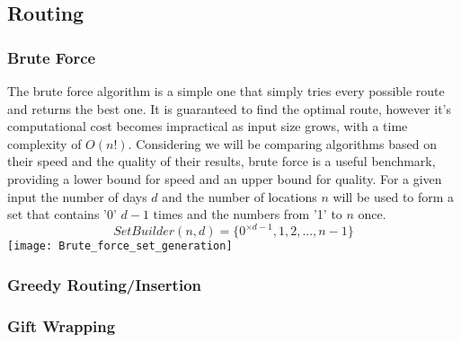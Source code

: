 
\subsection{Routing}\label{subsec:routing}
\subsubsection{Brute Force}\label{subsubsec:brute-force-routing}
The brute force algorithm is a simple one that simply tries every possible route and returns the best one.
It is guaranteed to find the optimal route, however it's computational cost becomes impractical as input size grows,
with a time complexity of $O(n!)$.
Considering we will be comparing algorithms based on their speed and the quality of their results, brute force is a
useful benchmark, providing a lower bound for speed and an upper bound for quality.
\pagebreak
For a given input the number of days $d$ and the number of locations $n$ will be used to form a set that contains
'0' $d-1$ times and the numbers from '1' to $n$ once.
\begin{equation}
    Set Builder(n,d) = {\{0^{\times d-1}, 1, 2, ..., n-1\}}
\end{equation}
\texttt{[image: Brute\_force\_set\_generation]}
\subsubsection{Greedy Routing/Insertion}\label{subsubsec:greedy-routing}
\subsubsection{Gift Wrapping}\label{subsubsec:gift-wrapping}

